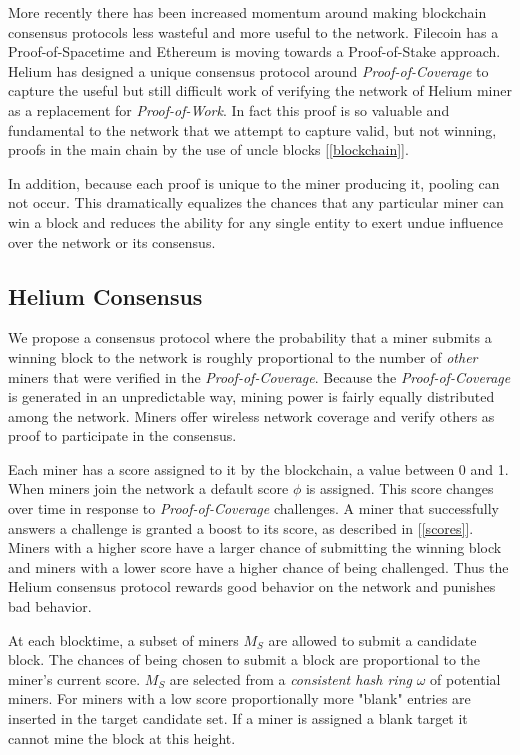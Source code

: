\documentclass[UTF8, 10pt, nonatbib, nocopyrightspace, reprint]{sigplanconf}
\newcommand{\secref}[1]{[\autoref{#1}]}
\begin{document}
More recently there has been increased momentum around making blockchain consensus protocols less wasteful and more useful to the network. Filecoin \cite{filecoin} has a Proof-of-Spacetime and Ethereum \cite{ethereum} is moving towards a Proof-of-Stake approach. Helium has designed a unique consensus protocol around \emph{Proof-of-Coverage} to capture the useful but still difficult work of verifying the network of Helium miner as a replacement for \emph{Proof-of-Work}. In fact this proof is so valuable and fundamental to the network that we attempt to capture valid, but not winning, proofs in the main chain by the use of uncle blocks \secref{blockchain}.

In addition, because each proof is unique to the miner producing it, pooling can not occur. This dramatically equalizes the chances that any particular miner can win a block and reduces the ability for any single entity to exert undue influence over the network or its consensus.

\subsection{Helium Consensus}

We propose a consensus protocol where the probability that a miner submits a winning block to the network is roughly proportional to the number of \emph{other} miners that were verified in the \emph{Proof-of-Coverage}. Because the \emph{Proof-of-Coverage} is generated in an unpredictable way, mining power is fairly equally distributed among the network. Miners offer wireless network coverage and verify others as proof to participate in the consensus.

Each miner has a score assigned to it by the blockchain, a value between 0 and 1. When miners join the network a default score $\phi$ is assigned. This score changes over time in response to \emph{Proof-of-Coverage} challenges. A miner that successfully answers a challenge is granted a boost to its score, as described in \secref{scores}. Miners with a higher score have a larger chance of submitting the winning block and miners with a lower score have a higher chance of being challenged. Thus the Helium consensus protocol rewards good behavior on the network and punishes bad behavior.

At each blocktime, a subset of miners $M_S$ are allowed to submit a candidate block. The chances of being chosen to submit a block are proportional to the miner's current score. $M_S$ are selected from a \emph{consistent hash ring} $\omega$ of potential miners. For miners with a low score proportionally more "blank" entries are inserted in the target candidate set. If a miner is assigned a blank target it cannot mine the block at this height.
\end{document}
